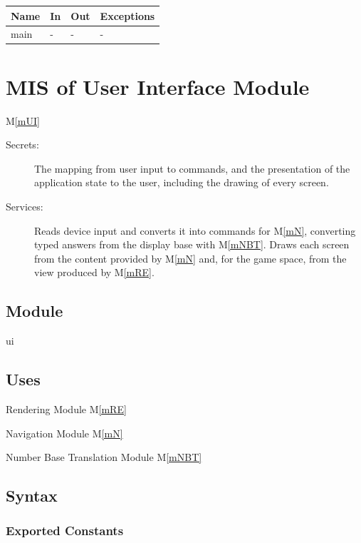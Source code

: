 \documentclass[12pt, titlepage]{article}
\newcommand{\mref}[1]{M\ref{#1}}
\begin{document}
\begin{center}
\begin{tabular}{p{2cm} p{4cm} p{4cm} p{2cm}}
\hline
\textbf{Name} & \textbf{In} & \textbf{Out} & \textbf{Exceptions} \\
\hline
main & - & - & - \\
\hline
\end{tabular}
\end{center}

\newpage

\section{MIS of User Interface Module} \mref{mUI} 

\begin{description}
\item[Secrets:] The mapping from user input to commands, and the presentation of the application state to the user, including the drawing of every screen.
\item[Services:] Reads device input and converts it into commands for \mref{mN}, converting typed answers from the display base with \mref{mNBT}. Draws each screen from the content provided by \mref{mN} and, for the game space, from the view produced by \mref{mRE}.
\end{description}

\subsection{Module}

ui

\subsection{Uses}

Rendering Module \mref{mRE}

Navigation Module \mref{mN}

Number Base Translation Module \mref{mNBT}


\subsection{Syntax}

\subsubsection{Exported Constants}
\end{document}
